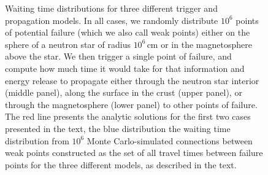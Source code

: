 \documentclass[12pt]{emulateapj}
\begin{document}
\begin{figure}
\centering
{}
                \vspace{-0.1cm}
        \vspace{-0.5cm}
         \vspace{0.5cm}
        \caption{Waiting time distributions for three different trigger and propagation models. In all cases, we randomly distribute $10^{6}$ points 
        of potential failure (which we also call weak points) 
        either on the sphere of a neutron star of radius $10^{6}\,\mathrm{cm}$ or in the magnetosphere above the star. We then trigger a single point of 
        failure, and compute how much time it would take for that 
        information and energy release to propagate either through the neutron star interior (middle panel), along the surface in the crust (upper panel),  
        or through the magnetosphere (lower panel) to other points of failure. The red line presents the analytic solutions for the first two cases presented
         in the text, the blue distribution the waiting time distribution from $10^{6}$ Monte Carlo-simulated connections between weak points
         constructed as the set of all travel times between failure points for the three different models, as described in the text.}
                \label{fig:wtmodels}
\end{figure}
\end{document}

